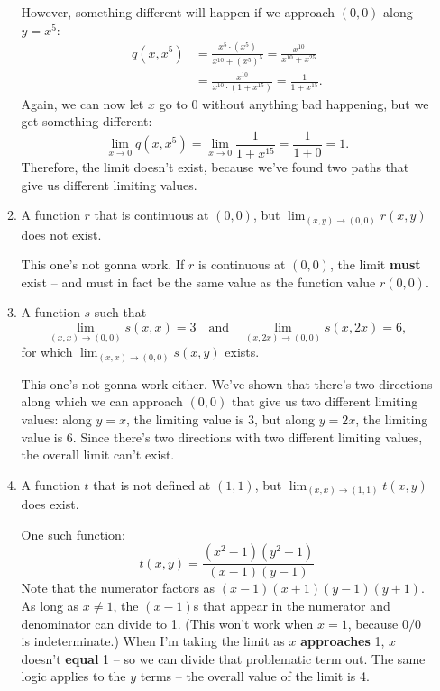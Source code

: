 \documentclass[10pt]{article}
\newenvironment{red}{\color{red}}{\ignorespacesafterend}
\begin{document}
\begin{enumerate}[leftmargin=0pt]
\begin{enumerate}
\begin{red}
            However, something different will happen if we approach $(0, 0)$ along $y=x^5$:
            \begin{align*}
                q(x, x^5) &= \frac{x^{5}\cdot (x^5)}{x^{10}+(x^5)^{5}}
                = \frac{x^{10}}{x^{10} + x^{25}} \\
                &= \frac{x^{10}}{x^{10}\cdot(1 + x^{15})} 
                = \frac{1}{1 + x^{15}}.
            \end{align*}
            Again, we can now let $x$ go to 0 without anything bad happening, but we get something different:
            \[\lim_{x\to 0} q(x, x^5) = \lim_{x\to 0}\frac{1}{1 + x^{15}} = \frac{1}{1+0} = 1.\]
            Therefore, the limit doesn't exist, because we've found two paths that give us different limiting values.
        \end{red}
        
        \item A function $r$ that is continuous at $(0, 0)$, but $\lim_{(x, y) \to (0, 0)} r(x, y)$ does not exist.
        
        \begin{red}
            This one's not gonna work. If $r$ is continuous at $(0, 0)$, the limit \textbf{must} exist -- and must in fact be the same value as the function value $r(0,0)$.
        \end{red}
        
        \item A function $s$ such that 
        \[\lim_{(x, x) \to (0, 0)} s(x, x) = 3 \quad \textrm{and} \quad
        \lim_{(x, 2x) \to (0, 0)} s(x, 2x) = 6,\]
        for which $\lim_{(x, x) \to (0, 0)} s(x, y)$ exists.
        
        \begin{red}
            This one's not gonna work either. We've shown that there's two directions along which we can approach $(0, 0)$ that give us two different limiting values: along $y=x$, the limiting value is 3, but along $y=2x$, the limiting value is 6. Since there's two directions with two different limiting values, the overall limit can't exist.
        \end{red}
        
        \item A function $t$ that is not defined at $(1, 1)$, but $\lim_{(x, x) \to (1, 1)} t(x, y)$ does exist.
        
        \begin{red}
            One such function:
            \[t(x, y) = \frac{(x^2-1)(y^2-1)}{(x-1)(y-1)}\]
            Note that the numerator factors as $(x-1)(x+1)(y-1)(y+1)$. As long as $x\neq 1$, the $(x-1)$s that appear in the numerator and denominator can divide to 1. (This won't work when $x=1$, because $0/0$ is indeterminate.) When I'm taking the limit as $x$ \textbf{approaches} 1, $x$ doesn't \textbf{equal} 1 -- so we can divide that problematic term out. The same logic applies to the $y$ terms -- the overall value of the limit is 4.
            

\end{red}
\end{enumerate}
\end{enumerate}
\end{document}
